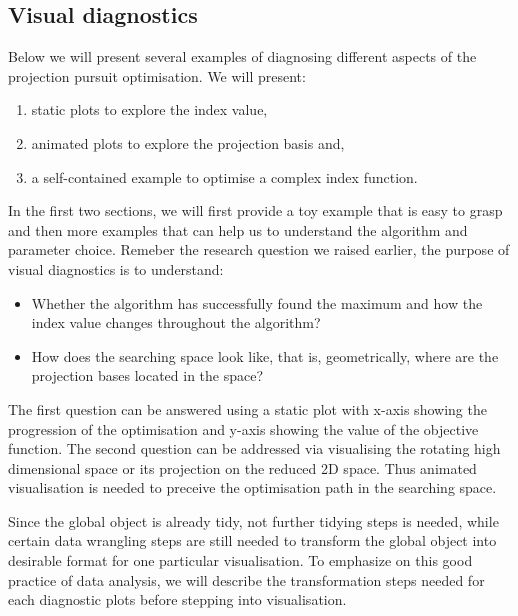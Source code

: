 \documentclass[12pt]{article}
\begin{document}
\hypertarget{visual-diagnostics}{%
\subsection{Visual diagnostics}\label{visual-diagnostics}}

Below we will present several examples of diagnosing different aspects
of the projection pursuit optimisation. We will present:

\begin{enumerate}
\def\labelenumi{\arabic{enumi})}
\item
  static plots to explore the index value,
\item
  animated plots to explore the projection basis and,
\item
  a self-contained example to optimise a complex index function.
\end{enumerate}

In the first two sections, we will first provide a toy example that is
easy to grasp and then more examples that can help us to understand the
algorithm and parameter choice. Remeber the research question we raised
earlier, the purpose of visual diagnostics is to understand:

\begin{itemize}
\item
  Whether the algorithm has successfully found the maximum and how the
  index value changes throughout the algorithm?
\item
  How does the searching space look like, that is, geometrically, where
  are the projection bases located in the space?
\end{itemize}

The first question can be answered using a static plot with x-axis
showing the progression of the optimisation and y-axis showing the value
of the objective function. The second question can be addressed via
visualising the rotating high dimensional space or its projection on the
reduced 2D space. Thus animated visualisation is needed to preceive the
optimisation path in the searching space.

Since the global object is already tidy, not further tidying steps is
needed, while certain data wrangling steps
\citep{wickham2016rfordatascience} are still needed to transform the
global object into desirable format for one particular visualisation. To
emphasize on this good practice of data analysis, we will describe the
transformation steps needed for each diagnostic plots before stepping
into visualisation.
\end{document}

